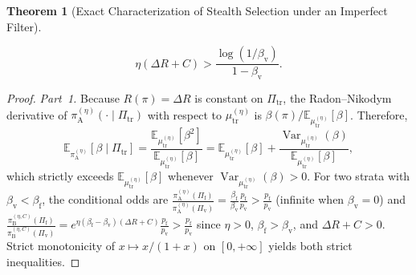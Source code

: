 \documentclass[11pt,a4paper]{article}
\newtheorem{theorem}{Theorem}
\newcommand{\E}{\mathbb{E}}
\newcommand{\Var}{\operatorname{Var}}
\begin{document}
\begin{theorem}[Exact Characterization of Stealth Selection under an Imperfect Filter]
\begin{enumerate}
\begin{enumerate}
    \begin{equation}\label{eq:inversion}
      \eta(\Delta R + C) > \frac{\log(1/\beta_{\mathrm{v}})}{1 - \beta_{\mathrm{v}}}.
    \end{equation}
  \end{enumerate}
\end{enumerate}
\end{theorem}

\begin{proof}
\emph{Part~1.} Because $R(\pi) = \Delta R$ is constant on $\Pi_{\mathrm{tr}}$, the Radon--Nikodym derivative of $\pi_{\mathrm{A}}^{(\eta)}(\cdot \mid \Pi_{\mathrm{tr}})$ with respect to $\mu_{\mathrm{tr}}^{(\eta)}$ is $\beta(\pi) / \E_{\mu_{\mathrm{tr}}^{(\eta)}}[\beta]$. Therefore,
\[
  \E_{\pi_{\mathrm{A}}^{(\eta)}}[\beta \mid \Pi_{\mathrm{tr}}]
  = \frac{\E_{\mu_{\mathrm{tr}}^{(\eta)}}[\beta^2]}{\E_{\mu_{\mathrm{tr}}^{(\eta)}}[\beta]}
  = \E_{\mu_{\mathrm{tr}}^{(\eta)}}[\beta] + \frac{\Var_{\mu_{\mathrm{tr}}^{(\eta)}}(\beta)}{\E_{\mu_{\mathrm{tr}}^{(\eta)}}[\beta]},
\]
which strictly exceeds $\E_{\mu_{\mathrm{tr}}^{(\eta)}}[\beta]$ whenever $\Var_{\mu_{\mathrm{tr}}^{(\eta)}}(\beta) > 0$. For two strata with $\beta_{\mathrm{v}} < \beta_{\mathrm{f}}$, the conditional odds are $\frac{\pi_{\mathrm{A}}^{(\eta)}(\Pi_{\mathrm{f}})}{\pi_{\mathrm{A}}^{(\eta)}(\Pi_{\mathrm{v}})} = \frac{\beta_{\mathrm{f}}}{\beta_{\mathrm{v}}}\frac{p_{\mathrm{f}}}{p_{\mathrm{v}}} > \frac{p_{\mathrm{f}}}{p_{\mathrm{v}}}$ (infinite when $\beta_{\mathrm{v}} = 0$) and $\frac{\pi_{\mathrm{B}}^{(\eta, C)}(\Pi_{\mathrm{f}})}{\pi_{\mathrm{B}}^{(\eta, C)}(\Pi_{\mathrm{v}})} = e^{\eta(\beta_{\mathrm{f}} - \beta_{\mathrm{v}})(\Delta R + C)}\frac{p_{\mathrm{f}}}{p_{\mathrm{v}}} > \frac{p_{\mathrm{f}}}{p_{\mathrm{v}}}$ since $\eta > 0$, $\beta_{\mathrm{f}} > \beta_{\mathrm{v}}$, and $\Delta R + C > 0$. Strict monotonicity of $x \mapsto x/(1+x)$ on $[0, +\infty]$ yields both strict inequalities.


\end{proof}
\end{document}
